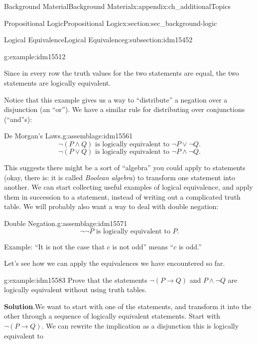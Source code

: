 \documentclass[oneside,10pt,]{book}
\numberwithin{equation}{chapter}
\def\imp{\rightarrow}
\begin{document}
\begin{appendixptx}{Background Material}{}{Background Material}{}{}{x:appendix:ch_additionalTopics}
\begin{sectionptx}{Propositional Logic}{}{Propositional Logic}{}{}{x:section:sec_background-logic}
\begin{subsectionptx}{Logical Equivalence}{}{Logical Equivalence}{}{}{g:subsection:idm15452}
\begin{example}{}{g:example:idm15512}
\begin{sidebyside}{1}{0}{0}{0}
\begin{sbspanel}{1}
{\par}
\end{sbspanel}%
\end{sidebyside}%
\par
Since in every row the truth values for the two statements are equal, the two statements are logically equivalent.%
\end{example}
Notice that this example gives us a way to ``distribute'' a negation over a disjunction (an ``or''). We have a similar rule for distributing over conjunctions (``and''s):%
\begin{assemblage}{De Morgan's Laws.}{g:assemblage:idm15561}%
%
\begin{equation*}
\neg(P \wedge Q) \text{ is logically equivalent to } \neg P \vee \neg Q.
\end{equation*}
%
\begin{equation*}
\neg(P \vee Q) \text{ is logically equivalent to } \neg P \wedge \neg Q.
\end{equation*}
%
\end{assemblage}
This suggests there might be a sort of ``algebra'' you could apply to statements (okay, there is: it is called \emph{Boolean algebra}) to transform one statement into another. We can start collecting useful examples of logical equivalence, and apply them in succession to a statement, instead of writing out a complicated truth table. We will probably also want a way to deal with double negation:%
\begin{assemblage}{Double Negation.}{g:assemblage:idm15571}%
%
\begin{equation*}
\neg \neg P \mbox{ is logically equivalent to } P.
\end{equation*}
%
\par
Example: ``It is not the case that \(c\) is not odd'' means ``\(c\) is odd.''%
\end{assemblage}
Let's see how we can apply the equivalences we have encountered so far.%
\begin{example}{}{g:example:idm15583}%
Prove that the statements \(\neg(P \imp Q)\) and \(P\wedge \neg Q\) are logically equivalent without using truth tables.%
\par\smallskip%
\noindent\textbf{Solution}.\hypertarget{g:solution:idm15588}{}\quad{}We want to start with one of the statements, and transform it into the other through a sequence of logically equivalent statements. Start with \(\neg(P \imp Q)\). We can rewrite the implication as a disjunction this is logically equivalent to%

\end{example}
\end{subsectionptx}
\end{sectionptx}
\end{appendixptx}
\end{document}
